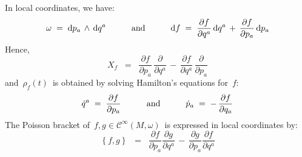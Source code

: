 \vskip 0.5cm
\begin{remark}
\mbox{}
\vskip 0.05cm
\noindent
In local coordinates, we have:
\begin{equation*}
\omega
\; = \;
	\textnormal{d} p_{a} \,\wedge\, \textnormal{d} q^{a}
\quad\quad\quad
\textnormal{and}
\quad\quad\quad
\textnormal{d} f
\; = \;
	\dfrac{\partial f}{\partial q^{a}}\,\textnormal{d} q^{a}
	\, + \,
	\dfrac{\partial f}{\partial p_{a}}\,\textnormal{d} p_{a}
\end{equation*}
Hence,
\begin{equation*}
X_{f}
\;\; = \;\;
	\dfrac{\partial f}{\partial p_{a}}\,\dfrac{\partial}{\partial q^{a}}
	\, - \,
	\dfrac{\partial f}{\partial q^{a}}\,\dfrac{\partial}{\partial p_{a}}
\end{equation*}
and \,$\rho_{f}(t)$\, is obtained by solving Hamilton's equations for \,$f$:\,
\begin{equation*}
\dot{q}^{a} \; = \; \dfrac{\partial f}{\partial p_{a}}
\quad\quad\quad
\textnormal{and}
\quad\quad\quad
\dot{p}_{a} \; = \; -\,\dfrac{\partial f}{\partial q_{a}}
\end{equation*}
The Poisson bracket of \,$f, g \in \mathscr{C}^{\infty}(M,\omega)$\, is expressed in local coordinates by:
\begin{equation*}
\left\{f,g\right\}
\;\; = \;\;
	\dfrac{\partial f}{\partial p_{a}}
	\dfrac{\partial g}{\partial q^{a}}
	\, - \,
	\dfrac{\partial g}{\partial p_{a}}
	\dfrac{\partial f}{\partial q^{a}}
\end{equation*}
\end{remark}

